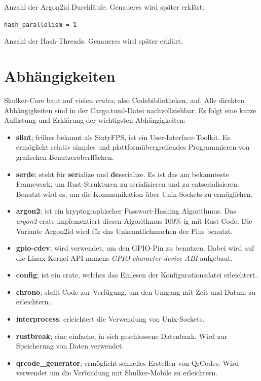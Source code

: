 Anzahl der Argon2id Durchläufe. Genaueres wird später erklärt.

\lstinline{hash_parallelism = 1}

Anzahl der Hash-Threads. Genaueres wird später erklärt.


\section{Abhängigkeiten}
Shulker-Core baut auf vielen \textit{crates}, also Codebibliotheken, auf. Alle direkten Abhängigkeiten sind in der 
Cargo.toml-Datei nachvollziehbar. Es folgt eine kurze Auflistung und Erklärung der wichtigsten Abhängigkeiten:

\begin{itemize}
    \item \textbf{slint}; früher bekannt als SixtyFPS, ist ein User-Interface-Toolkit. Es ermöglicht relativ simples
    und plattformübergreifendes Programmieren von grafischen Benutzeroberflächen.

    \item \textbf{serde}; steht für \textbf{ser}ialize und \textbf{de}serialize. Es ist das am bekannteste Framework,
    um Rust-Strukturen zu serialisieren und zu entserialisieren. Benutzt wird es, um die Kommunikation über Unix-Sockets zu
    ermöglichen.

    \item \textbf{argon2}; ist ein kryptographischer Passwort-Hashing Algorithmus. Das \textit{argon2}-crate implementiert diesen
    Algorithmus 100\%-ig mit Rust-Code. Die Variante Argon2id wird für das Unkenntlichmachen der Pins benutzt.

    \item \textbf{gpio-cdev}; wird verwendet, um den GPIO-Pin zu benutzen. Dabei wird auf die Linux-Kernel-API namens \textit{GPIO character device ABI}
    aufgebaut.

    \item \textbf{config}; ist ein crate, welches das Einlesen der Konfigurationsdatei erleichtert.
    
    \item \textbf{chrono}; stellt Code zur Verfügung, um den Umgang mit Zeit und Datum zu erleichtern.
    
    \item \textbf{interprocess}; erleichtert die Verwendung von Unix-Sockets.
    
    \item \textbf{rustbreak}; eine einfache, in sich geschlossene Datenbank. Wird zur Speicherung von Daten verwendet.
    
    \item \textbf{qrcode\_generator}; ermöglicht schnelles Erstellen von QrCodes. Wird verwendet um die Verbindung mit Shulker-Mobile zu
    erleichtern.
\end{itemize}